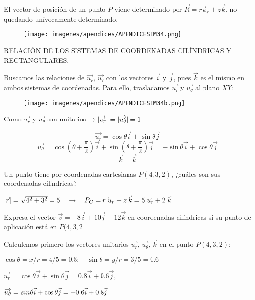 El vector de posición de un punto $P$ viene determinado por $\vec R=r \vec u_r+z\vec k$, no quedando unívocamente determinado.


\begin{figure}[H]
	\centering
	\texttt{[image: imagenes/apendices/APENDICESIM34.png]}
\end{figure}


RELACIÓN DE LOS SISTEMAS DE COORDENADAS CILÍNDRICAS Y RECTANGULARES.

Buscamos las relaciones de $\overrightarrow{u_r}$, $\overrightarrow{u_{\theta}}$ con los vectores $\vec i$ y $\vec j$, pues $\vec k$ es el mismo en ambos sistemas de coordenadas. Para ello, trasladamos $\overrightarrow{u_r}$ y $\overrightarrow{u_{\theta}}$ al plano $XY$:

\begin{figure}[H]
	\centering
	\texttt{[image: imagenes/apendices/APENDICESIM34b.png]}
\end{figure}

Como $\overrightarrow{u_r}$ y $\overrightarrow{u_{\theta}}$  son unitarios $\to \abs{\overrightarrow{u_r}}=\abs{\overrightarrow{u_{\theta}}}=1$ 

$$ \overrightarrow{u_r}= \cos \theta \vec i + \sin \theta \vec j$$
$$ \overrightarrow{u_{\theta}}=\cos \left(\theta+\dfrac \pi 2 \right) \vec i + \sin \left(\theta+\dfrac \pi 2 \right) \vec j=-\sin \theta \vec i + \cos \theta \vec j$$
$$\vec k=\vec k$$

\begin{ejem}
	Un punto tiene por coordenadas cartesianas $P(4,3,2)$, ¿cuáles son sus coordenadas cilíndricas?
\end{ejem}
$\abs{\vec r}=\sqrt{4^2+3^2}=5 \quad \to \quad P_C=r\vec \;{u_r} + z \; \vec k = 5\; \vec {u_r}+2 \; \vec k$
\vspace{5mm}\begin{ejem}
Expresa el vector $\vec v=-8\vec i+10\vec j-12\vec k$ en coordenadas cilíndricas si su punto de aplicación está en $P(4,3,2$	
\end{ejem}
Calculemos primero los vectores unitarios $\overrightarrow{u_r}$, $\overrightarrow{u_{\theta}}$, $\vec k$ en el punto $P(4,3,2)$:


$\cos \theta=x/r=4/5=0.8; \quad \sin \theta=y/r=3/5=0.6$

$\overrightarrow{u_r} =\cos \theta \vec i + \sin \theta \vec j=0.8\vec i + 0.6 \vec j$, 

$\overrightarrow{u_{\theta}}=\-sin \theta \vec i + \cos \theta \vec j=-0.6\vec i + 0.8 \vec j$

